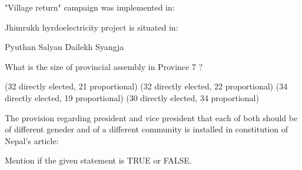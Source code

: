 \begin{questions}
\question "Village return" campaign was implemented in:
  \begin{choices}
  \end{choices}

\question Jhimrukh hyrdoelectricity project is situated in:
  \begin{choices}
  \CorrectChoice Pyuthan
  \choice Salyan
  \choice Dailekh
  \choice Syangja
  \end{choices}

\question What is the size of provincial assembly in Province 7 ?
  \begin{choices}
   (32 directly elected, 21 proportional)
   (32 directly elected, 22 proportional)
   (34 directly elected, 19 proportional)
   (30 directly elected, 34 proportional)
  \end{choices}

\question The provision regarding president and vice president that each of both should be of different geneder and of a different community is installed in constitution of Nepal's article:
  \begin{choices}
  \end{choices}

\end{questions}

\begin{questions}


\question Mention if the given statement is TRUE or FALSE.

\end{questions}

